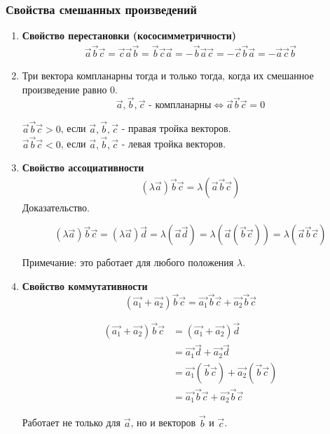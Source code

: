 \subsubsection{Свойства смешанных произведений}

\begin{enumerate}
  \item \textbf{Свойство перестановки (кососимметричности)} \\
    \begin{gather*}
      \vec{a} \vec{b} \vec{c} = \vec{c} \vec{a} \vec{b} = \vec{b} \vec{c} \vec{a} = -\vec{b} \vec{a} \vec{c} = - \vec{c} \vec{b} \vec{a} = - \vec{a} \vec{c} \vec{b}
    \end{gather*}

  \item Три вектора компланарны тогда и только тогда, когда их смешанное произведение равно 0. \[
  \vec{a}, \vec{b}, \vec{c} \text{ - компланарны} \iff \vec{a} \vec{b} \vec{c} = 0
  \] 
    \begin{note}
      $\vec{a} \vec{b} \vec{c} > 0$, если $\vec{a}, \vec{b}, \vec{c}$ - правая тройка векторов. \\
      $\vec{a} \vec{b} \vec{c} < 0$, если $\vec{a}, \vec{b}, \vec{c}$ - левая тройка векторов.
    \end{note}

  \item \textbf{Свойство ассоциативности} \\
    \begin{gather*}
      (\lambda \vec{a}) \vec{b} \vec{c} = \lambda (\vec{a} \vec{b} \vec{c})
    \end{gather*}
      Доказательство.
      \begin{proof*}
        \[(\lambda \vec{a}) \vec{b} \vec{c} = (\lambda \vec{a}) \vec{d} = \lambda (\vec{a} \vec{d}) = \lambda (\vec{a} (\vec{b} \vec{c})) = \lambda (\vec{a} \vec{b} \vec{c})\]
      \end{proof*}
      \begin{note}
        Примечание: это работает для любого положения $\lambda$.
      \end{note}

  \item \textbf{Свойство коммутативности} 
    \[
      (\vec{a_1} + \vec{a_2}) \vec{b} \vec{c} = \vec{a_1} \vec{b} \vec{c} + \vec{a_2} \vec{b} \vec{c}
    \] 
    \begin{proof*}
      \begin{align*}
        (\vec{a_1} + \vec{a_2}) \vec{b} \vec{c} 
          &= (\vec{a_1} + \vec{a_2}) \vec{d}\\
          &= \vec{a_1} \vec{d} + \vec{a_2} \vec{d}\\
          &= \vec{a_1} (\vec{b} \vec{c}) + \vec{a_2} (\vec{b} \vec{c})\\
          &= \vec{a_1} \vec{b} \vec{c} + \vec{a_2} \vec{b} \vec{c}
      \end{align*}
    \end{proof*}
    \begin{note}
      Работает не только для $\vec{a}$, но и векторов $\vec{b}$ и $\vec{c}$.
    \end{note}
\end{enumerate}

